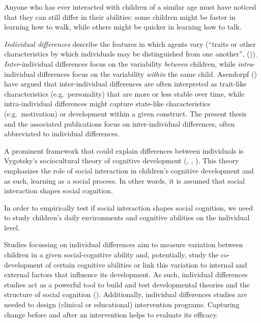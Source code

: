 \documentclass[
]{scrbook}
\begin{document}
Anyone who has ever interacted with children of a similar age must have noticed that they can still differ in their abilities: some children might be faster in learning how to walk, while others might be quicker in learning how to talk.

\emph{Individual differences} describe the features in which agents vary (``traits or other characteristics by which individuals may be distinguished from one another'', ()). \emph{Inter}-individual differences focus on the variability \emph{between} children, while \emph{intra}-individual differences focus on the variability \emph{within} the same child. Asendorpf () have argued that inter-individual differences are often interpreted as trait-like characteristics (e.g.~personality) that are more or less stable over time, while intra-individual differences might capture state-like characteristics (e.g.~motivation) or development within a given construct. The present thesis and the associated publications focus on inter-individual differences, often abbreviated to individual differences.

A prominent framework that could explain differences between individuals is Vygotsky's sociocultural theory of cognitive development (, , ). This theory emphasizes the role of social interaction in children's cognitive development and as such, learning as a social process. In other words, it is assumed that social interaction shapes social cognition.

In order to empirically test if social interaction shapes social cognition, we need to study children's daily environments and cognitive abilities on the individual level.

Studies focussing on individual differences aim to measure variation between children in a given social-cognitive ability and, potentially, study the co-development of certain cognitive abilities or link this variation to internal and external factors that influence its development. As such, individual differences studies act as a powerful tool to build and test developmental theories and the structure of social cognition (). Additionally, individual differences studies are needed to design (clinical or educational) intervention programs. Capturing change before and after an intervention helps to evaluate its efficacy.
\end{document}
